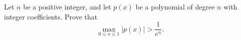 Let \(n\) be a positive integer, and let \(p(x)\) be a polynomial of
degree \(n\) with integer coefficients.  Prove that
\[
\max_{0\le x\le1} \big|p(x)\big| > \frac1{e^n}.
\]
